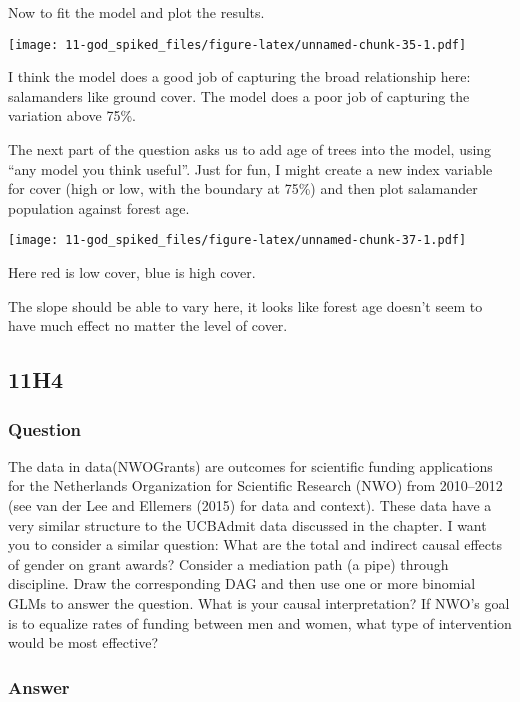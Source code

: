 \documentclass[
]{book}
\begin{document}
Now to fit the model and plot the results.

\texttt{[image: 11-god\_spiked\_files/figure-latex/unnamed-chunk-35-1.pdf]}

I think the model does a good job of capturing the broad relationship here: salamanders like ground cover. The model does a poor job of capturing the variation above 75\%.

The next part of the question asks us to add age of trees into the model, using ``any model you think useful''. Just for fun, I might create a new index variable for cover (high or low, with the boundary at 75\%) and then plot salamander population against forest age.

\texttt{[image: 11-god\_spiked\_files/figure-latex/unnamed-chunk-37-1.pdf]}

Here red is low cover, blue is high cover.

The slope should be able to vary here, it looks like forest age doesn't seem to have much effect no matter the level of cover.

\hypertarget{h4-4}{%
\subsection*{11H4}\label{h4-4}}

\hypertarget{question-96}{%
\subsubsection*{Question}\label{question-96}}

The data in data(NWOGrants) are outcomes for scientific funding applications for the Netherlands Organization for Scientific Research (NWO) from 2010--2012 (see van der Lee and Ellemers (2015) for data and context). These data have a very similar structure to the UCBAdmit data discussed in the chapter. I want you to consider a similar question: What are the total and indirect causal effects of gender on grant awards? Consider a mediation path (a pipe) through discipline. Draw the corresponding DAG and then use one or more binomial GLMs to answer the question. What is your causal interpretation? If NWO's goal is to equalize rates of funding between men and women, what type of intervention would be most effective?

\hypertarget{answer-96}{%
\subsubsection*{Answer}\label{answer-96}}
\end{document}
